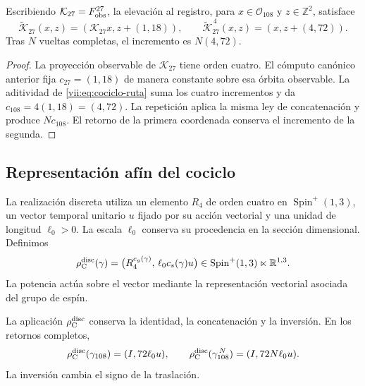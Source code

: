 \begin{proposition}
\label{vii:prop:memoria-vuelta-completa}
Escribiendo \(\mathcal K_{27}=F_{\rm obs}^{27}\), la elevación
al registro, para \(x\in\mathcal O_{108}\) y \(z\in\mathbb Z^2\), satisface
\[
 \widetilde{\mathcal K}_{27}(x,z)
   =(\mathcal K_{27}x,z+(1,18)),\qquad
 \widetilde{\mathcal K}_{27}^{\,4}(x,z)
   =(x,z+(4,72)).
\]
Tras \(N\) vueltas completas, el incremento es \(N(4,72)\).
\end{proposition}

\begin{proof}
La proyección observable de \(\mathcal K_{27}\) tiene orden cuatro.
El cómputo canónico anterior fija \(c_{27}=(1,18)\) de manera constante
sobre esa órbita observable. La aditividad de
\eqref{vii:eq:cociclo-ruta} suma los cuatro incrementos y da
\(c_{108}=4(1,18)=(4,72)\).
La repetición aplica la misma ley de concatenación y produce
\(Nc_{108}\). El retorno de la primera coordenada conserva el
incremento de la segunda.
\end{proof}

\pagebreak %
\subsection{Representación afín del cociclo}
\label{vii:subsec:representacion-afin-cociclo}

La realización discreta utiliza un elemento \(R_4\) de orden cuatro en
\(\operatorname{Spin}^+(1,3)\), un vector temporal unitario \(u\)
fijado por su acción vectorial y una unidad de longitud \(\ell_0>0\).
La escala \(\ell_0\) conserva su procedencia en la sección dimensional.
Definimos
\begin{equation}
 \rho_{\rm C}^{\rm disc}(\gamma)=
 \bigl(R_4^{c_g(\gamma)},\,\ell_0c_s(\gamma)u\bigr)
 \in\operatorname{Spin}^+(1,3)\ltimes\mathbb R^{1,3}.
 \label{vii:eq:representacion-discreta-memoria}
\end{equation}
La potencia actúa sobre el vector mediante la representación vectorial
asociada del grupo de espín.

\begin{theorem}
\label{vii:thm:traslacion-memoria}
La aplicación \(\rho_{\rm C}^{\rm disc}\) conserva la identidad,
la concatenación y la inversión. En los retornos completos,
\begin{equation}
 \rho_{\rm C}^{\rm disc}(\gamma_{108})=(I,72\ell_0u),\qquad
 \rho_{\rm C}^{\rm disc}(\gamma_{108}^{\,N})=(I,72N\ell_0u).
 \label{vii:eq:traslacion-retorno-108}
\end{equation}
La inversión cambia el signo de la traslación.
\end{theorem}

